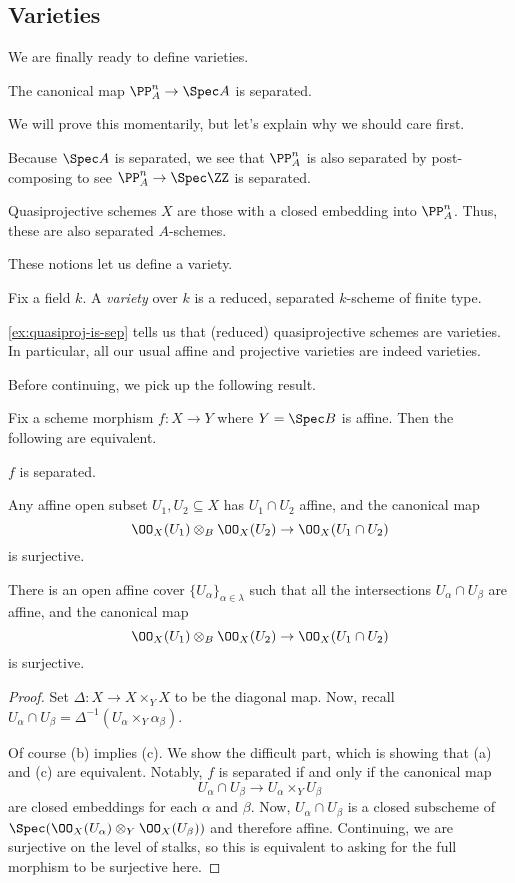 \documentclass[../notes.tex]{subfiles}
\begin{document}
\subsection{Varieties}
We are finally ready to define varieties.
\begin{proposition} \label{prop:proj-is-sep}
	The canonical map $\PP^n_A\to\Spec A$ is separated.
\end{proposition}
We will prove this momentarily, but let's explain why we should care first.
\begin{example}
	Because $\Spec A$ is separated, we see that $\PP^n_A$ is also separated by post-composing to see $\PP^n_A\to\Spec\ZZ$ is separated.
\end{example}
\begin{example} \label{ex:quasiproj-is-sep}
	Quasiprojective schemes $X$ are those with a closed embedding into $\PP^n_A$. Thus, these are also separated $A$-schemes.
\end{example}
These notions let us define a variety.
\begin{definition}[Variety]
	Fix a field $k$. A \textit{variety} over $k$ is a reduced, separated $k$-scheme of finite type.
\end{definition}
\begin{example}
	\autoref{ex:quasiproj-is-sep} tells us that (reduced) quasiprojective schemes are varieties. In particular, all our usual affine and projective varieties are indeed varieties.
\end{example}
Before continuing, we pick up the following result.
\begin{proposition}
	Fix a scheme morphism $f\colon X\to Y$ where $Y=\Spec B$ is affine. Then the following are equivalent.
	\begin{listalph}
		\item $f$ is separated.
		\item Any affine open subset $U_1,U_2\subseteq X$ has $U_1\cap U_2$ affine, and the canonical map
		\[\OO_X(U_1)\otimes_B\OO_X(U_2)\to\OO_X(U_1\cap U_2)\]
		is surjective.
		\item There is an open affine cover $\{U_\alpha\}_{\alpha\in\lambda}$ such that all the intersections $U_\alpha\cap U_\beta$ are affine, and the canonical map
		\[\OO_X(U_1)\otimes_B\OO_X(U_2)\to\OO_X(U_1\cap U_2)\]
		is surjective.
	\end{listalph}
\end{proposition}
\begin{proof}
	Set $\Delta\colon X\to X\times_YX$ to be the diagonal map. Now, recall $U_\alpha\cap U_\beta=\Delta^{-1}(U_\alpha\times_Y\alpha_\beta)$.

	Of course (b) implies (c). We show the difficult part, which is showing that (a) and (c) are equivalent. Notably, $f$ is separated if and only if the canonical map
	\[U_\alpha\cap U_\beta\to U_\alpha\times_YU_\beta\]
	are closed embeddings for each $\alpha$ and $\beta$. Now, $U_\alpha\cap U_\beta$ is a closed subscheme of $\Spec(\OO_X(U_\alpha)\otimes_Y\OO_X(U_\beta))$ and therefore affine. Continuing, we are surjective on the level of stalks, so this is equivalent to asking for the full morphism to be surjective here.
\end{proof}
\end{document}
